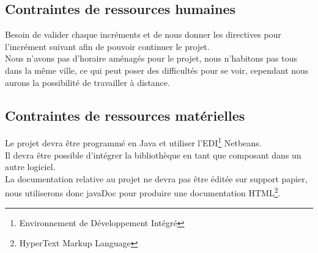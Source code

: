 \documentclass[12pt,a4paper,openany]{article}
\begin{document}
	\subsection{Contraintes de ressources humaines}
	Besoin de valider chaque incréments et de nous donner les directives pour l'incrément suivant afin de pouvoir continuer le projet. \\
	Nous n'avons pas d'horaire aménagés pour le projet, nous n'habitons pas tous dans la même ville, ce qui peut poser des difficultés pour se voir, cependant
	nous aurons la possibilité de travailler à distance. 
	\subsection{Contraintes de ressources matérielles}
	Le projet devra être programmé en Java et utiliser l'EDI\footnote{Environnement de Développement Intégré} Netbeans. \\
	Il devra être possible d'intégrer la bibliothèque en tant que composant dans un autre logiciel. \\
	La documentation relative au projet ne devra pas être éditée sur support papier, nous utiliserons donc javaDoc pour produire une documentation 
	HTML\footnote{HyperText Markup Language}.  
	
\end{document}
